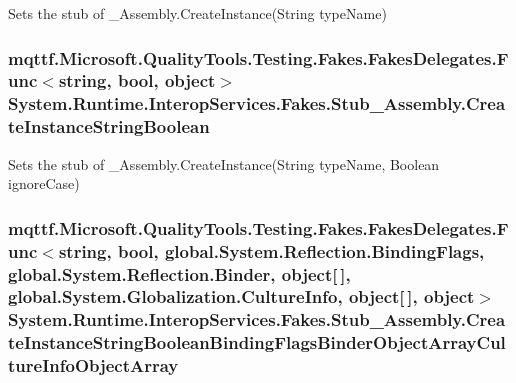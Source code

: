 Sets the stub of \-\_\-\-Assembly.\-Create\-Instance(\-String type\-Name)

\hypertarget{class_system_1_1_runtime_1_1_interop_services_1_1_fakes_1_1_stub___assembly_ae2e82791449871cf9fcaa74441049ac1}{
\subsubsection[{Create\-Instance\-String\-Boolean}]{\setlength{\rightskip}{0pt plus 5cm}mqttf.\-Microsoft.\-Quality\-Tools.\-Testing.\-Fakes.\-Fakes\-Delegates.\-Func$<$string, bool, object$>$ System.\-Runtime.\-Interop\-Services.\-Fakes.\-Stub\-\_\-\-Assembly.\-Create\-Instance\-String\-Boolean}}\label{class_system_1_1_runtime_1_1_interop_services_1_1_fakes_1_1_stub___assembly_ae2e82791449871cf9fcaa74441049ac1}


Sets the stub of \-\_\-\-Assembly.\-Create\-Instance(\-String type\-Name, Boolean ignore\-Case)

\hypertarget{class_system_1_1_runtime_1_1_interop_services_1_1_fakes_1_1_stub___assembly_aee8078aa87f61cff0caa82fbffc129a5}{
\subsubsection[{Create\-Instance\-String\-Boolean\-Binding\-Flags\-Binder\-Object\-Array\-Culture\-Info\-Object\-Array}]{\setlength{\rightskip}{0pt plus 5cm}mqttf.\-Microsoft.\-Quality\-Tools.\-Testing.\-Fakes.\-Fakes\-Delegates.\-Func$<$string, bool, global.\-System.\-Reflection.\-Binding\-Flags, global.\-System.\-Reflection.\-Binder, object\mbox{[}$\,$\mbox{]}, global.\-System.\-Globalization.\-Culture\-Info, object\mbox{[}$\,$\mbox{]}, object$>$ System.\-Runtime.\-Interop\-Services.\-Fakes.\-Stub\-\_\-\-Assembly.\-Create\-Instance\-String\-Boolean\-Binding\-Flags\-Binder\-Object\-Array\-Culture\-Info\-Object\-Array}}\label{class_system_1_1_runtime_1_1_interop_services_1_1_fakes_1_1_stub___assembly_aee8078aa87f61cff0caa82fbffc129a5}


